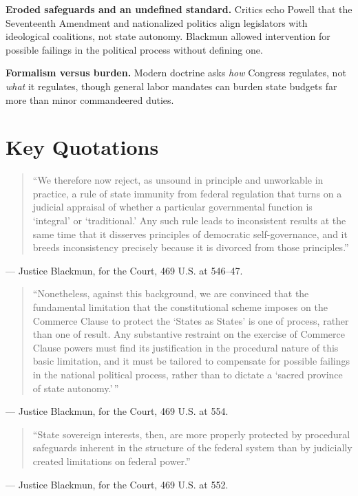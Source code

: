 \documentclass[12pt]{article}
\begin{document}
\textbf{Eroded safeguards and an undefined standard.} Critics echo Powell that the Seventeenth Amendment and nationalized politics align legislators with ideological coalitions, not state autonomy. Blackmun allowed intervention for possible failings in the political process without defining one.

\textbf{Formalism versus burden.} Modern doctrine asks \emph{how} Congress regulates, not \emph{what} it regulates, though general labor mandates can burden state budgets far more than minor commandeered duties.

\section{Key Quotations}

\begin{quote}
``We therefore now reject, as unsound in principle and unworkable in practice, a rule of state immunity from federal regulation that turns on a judicial appraisal of whether a particular governmental function is `integral' or `traditional.' Any such rule leads to inconsistent results at the same time that it disserves principles of democratic self-governance, and it breeds inconsistency precisely because it is divorced from those principles.''
\end{quote}
\noindent --- Justice Blackmun, for the Court, 469 U.S. at 546--47.

\begin{quote}
``Nonetheless, against this background, we are convinced that the fundamental limitation that the constitutional scheme imposes on the Commerce Clause to protect the `States as States' is one of process, rather than one of result. Any substantive restraint on the exercise of Commerce Clause powers must find its justification in the procedural nature of this basic limitation, and it must be tailored to compensate for possible failings in the national political process, rather than to dictate a `sacred province of state autonomy.'\,''
\end{quote}
\noindent --- Justice Blackmun, for the Court, 469 U.S. at 554.

\begin{quote}
``State sovereign interests, then, are more properly protected by procedural safeguards inherent in the structure of the federal system than by judicially created limitations on federal power.''
\end{quote}
\noindent --- Justice Blackmun, for the Court, 469 U.S. at 552.
\end{document}
